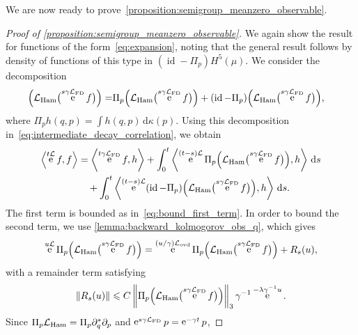 \documentclass[11pt,a4paper]{article}
\DeclareMathOperator{\e}{e}
\DeclareMathOperator{\id}{id}
\renewcommand{\d}{\mathrm d}
\theoremstyle{plain}
\numberwithin{equation}{section}
\renewcommand{\leq}{\leqslant}
\begin{document}
We are now ready to prove~\cref{proposition:semigroup_meanzero_observable}.
\begin{proof}
    [Proof of \cref{proposition:semigroup_meanzero_observable}]
    We again show the result for functions of the form~\eqref{eq:expansion},
    noting that the general result follows by density of functions of this type in $(\id - \Pi_p) H^5(\mu)$.
    We consider the decomposition
    \begin{align}
        \label{eq:decomposition}
        \Bigl( \mathcal L_{\rm Ham} \bigl(\e^{s \gamma \mathcal L_{\rm FD}} f\bigr) \Bigr)
         =& \Pi_p \Bigl( \mathcal L_{\rm Ham} \bigl(\e^{s \gamma \mathcal L_{\rm FD}} f\bigr) \Bigr)
         + (\id - \Pi_p) \Bigl( \mathcal L_{\rm Ham} \bigl(\e^{s \gamma \mathcal L_{\rm FD}} f\bigr) \Bigr),
    \end{align}
    where $\Pi_p h(q, p) = \int h(q, p) \, \d \kappa(p)$.
    Using this decomposition in~\eqref{eq:intermediate_decay_correlation},
    we obtain
    \begin{align}
        \notag
        \ip{\e^{t \mathcal L} f}{f}
        &= \ip{\e^{t \gamma \mathcal L_{\rm FD}} f}{h}
        + \int_{0}^t \ip{\e^{(t-s) \mathcal L} \Pi_p \Bigl( \mathcal L_{\rm Ham} \bigl(\e^{s \gamma \mathcal L_{\rm FD}} f\bigr) \Bigr)}{h} \, \d s\\
        \label{eq:intermediate_decay_correlation_2}
        &\quad + \int_{0}^t \ip{\e^{(t-s) \mathcal L} (\id - \Pi_p) \Bigl( \mathcal L_{\rm Ham} \bigl(\e^{s \gamma \mathcal L_{\rm FD}} f\bigr) \Bigr)}{h} \, \d s.
    \end{align}
    The first term is bounded as in~\eqref{eq:bound_first_term}.
    In order to bound the second term,
    we use \cref{lemma:backward_kolmogorov_obs_q},
    which gives
    \begin{equation}
        \label{eq:semigroup_on_q_part}
        \e^{u \mathcal L} \Pi_p \Bigl( \mathcal L_{\rm Ham} \bigl(\e^{s \gamma \mathcal L_{\rm FD}} f\bigr) \Bigr)
        =  \e^{(u/\gamma) \mathcal L_{\rm ovd}} \Pi_p \Bigl( \mathcal L_{\rm Ham} \bigl(\e^{s \gamma \mathcal L_{\rm FD}} f\bigr) \Bigr) + R_s(u),
    \end{equation}
    with a remainder term satisfying
    \begin{equation}
        \label{eq:bound_remainder}
        \norm{R_s(u)} \leq C \norm{\Pi_p \Bigl( \mathcal L_{\rm Ham} \bigl(\e^{s \gamma \mathcal L_{\rm FD}} f\bigr) \Bigr)}[3] \gamma^{-1} \e^{-\lambda \gamma^{-1} u}.
    \end{equation}
    Since $\Pi_p \mathcal L_{\rm Ham} = \Pi_p \partial_q^*\partial_p$ and $\e^{s \gamma \mathcal L_{\rm FD}} p = \e^{-\gamma t}p$,

\end{proof}
\end{document}
